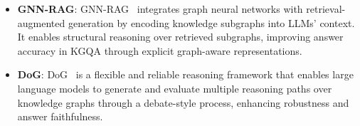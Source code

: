\begin{itemize}
\begin{itemize}
    
    \item \textbf{GNN-RAG}: GNN-RAG~\cite{mavromatis2024gnn} integrates graph neural networks with retrieval-augmented generation by encoding knowledge subgraphs into LLMs' context. It enables structural reasoning over retrieved subgraphs, improving answer accuracy in KGQA through explicit graph-aware representations.
    \item \textbf{DoG}: DoG~\cite{ma2025debate} is a flexible and reliable reasoning framework that enables large language models to generate and evaluate multiple reasoning paths over knowledge graphs through a debate-style process, enhancing robustness and answer faithfulness.

\end{itemize}
\end{itemize}
